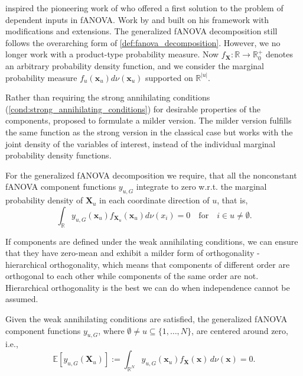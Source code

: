 \citet{stone1994} inspired the pioneering work of \citet{hooker2007} who offered a first solution to the problem of dependent inputs in fANOVA. Work by \cite{chastaing2012} and \cite{rahman2014} built on his framework with modifications and extensions.
The generalized fANOVA decomposition still follows the overarching form of \autoref{def:fanova_decomposition}.
However, we no longer work with a product-type probability measure. 
Now $f_{\boldsymbol{X}}: \mathbb{R} \rightarrow \mathbb{R}_{0}^{+}$ 
denotes an arbitrary probability density function, and we consider 
the marginal probability measure 
$f_{u}(\boldsymbol{x}_u) d\nu(\boldsymbol{x}_u)$ supported on $\mathbb{R}^{|u|}$.

Rather than requiring the strong annihilating conditions (\autoref{cond:strong_annihilating_conditions}) for desirable properties of the components, \cite{rahman2014} proposed to formulate a milder version.
The milder version fulfills the same function as the strong version in the classical case but works with the joint density of the variables of interest, instead of the individual marginal probability density functions.
\begin{condition}\label{cond:weak_annihilating_conditions}
    For the generalized fANOVA decomposition we require, that all the nonconstant fANOVA component functions $y_{u, G}$ integrate to zero w.r.t. the marginal probability density of $\boldsymbol{X}_u$ in each coordinate direction of $u$, that is,
\begin{equation}
    \int_{\mathbb{R}} y_{u, G}(\boldsymbol{x}_u) f_{\boldsymbol{X}_u}(\boldsymbol{x}_u) d\nu (x_i) = 0 \quad \text{for} \quad i \in u \neq \emptyset.
\end{equation}
\end{condition}
If components are defined under the weak annihilating conditions, we can ensure that they have zero-mean and exhibit a milder form of orthogonality - hierarchical orthogonality, which means that components of different order are orthogonal to each other while components of the same order are not. Hierarchical orthogonality is the best we can do when independence cannot be assumed.
\begin{proposition}\label{eq:zero_mean_g}
    Given the weak annihilating conditions are satisfied, the generalized fANOVA component functions $y_{u, G}$, where $\emptyset \neq u \subseteq \{1, \ldots, N\}$, are centered around zero, i.e.,
\begin{equation}
    \mathbb{E}[y_{u, G}(\boldsymbol{X}_u)] := \int_{\mathbb{R}^N} y_{u, G}(\boldsymbol{x}_u) f_{\boldsymbol{X}}(\boldsymbol{x}) \, d\nu (\boldsymbol{x}) = 0.
\end{equation}
\end{proposition}


